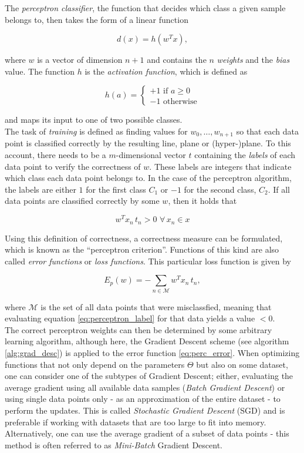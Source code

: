 The \textit{perceptron classifier}, the function that decides which class a given sample belongs to, then takes the form of a linear function

\[ d(x) = h(w^{T}x), \label{eq:perc_class} \]

\noindent where $w$ is a vector of dimension $n+1$ and contains the $n$ \textit{weights} and the \textit{bias} value. The function $h$ is the \textit{activation function}, which is defined as 

\[ h(a) =  \begin{cases}
		+1 \text{ if } a \geq 0 \\
	   	 -1 \text{ otherwise}
	    \end{cases}\]

\noindent and maps its input to one of two possible classes.\\

\noindent The task of \textit{training} is defined as finding values for $w_0, \dots, w_{n+1}$ so that each data point is classified correctly by the resulting line, plane or (hyper-)plane. To this account, there needs to be a $m$-dimensional vector $t$ containing the \textit{labels} of each data point to verify the correctness of $w$. These labels are integers that indicate which class each data point belongs to. In the case of the perceptron algorithm, the labels are either $1$ for the first class $C_1$ or $-1$ for the second class, $C_2$. If all data points are classified correctly by some $w$, then it holds that

\[ w^T x_n \, t_n > 0 \,\,\forall\, x_n \in x \label{eq:perceptron_label} \]

\noindent Using this definition of correctness, a correctness measure can be formulated, which is known as the ``perceptron criterion''. Functions of this kind are also called \textit{error functions} or \textit{loss functions}. This particular loss function is given by

\[ E_p(w) = - \sum \limits_{n \in \mathcal{M}} w^T x_n\, t_n, \label{eq:perc_error}\]

\noindent where $\mathcal{M}$ is the set of all data points that were misclassfied, meaning that evaluating equation \ref{eq:perceptron_label} for that data yields a value $< 0$. \cite[pp. 192--194]{bishop_pattern}\\

\noindent The correct perceptron weights can then be determined by some arbitrary learning algorithm, although here, the Gradient Descent scheme (see algorithm \ref{alg:grad_desc}) is applied to the error function \ref{eq:perc_error}. When optimizing functions that not only depend on the parameters $\Theta$ but also on some dataset, one can consider one of the subtypes of Gradient Descent; either, evaluating the average gradient using all available data samples (\textit{Batch Gradient Descent}) or using single data points only - as an approximation of the entire dataset - to perform the updates. This is called \textit{Stochastic Gradient Descent} (SGD) and is preferable if working with datasets that are too large to fit into memory. Alternatively, one can use the average gradient of a subset of data points - this method is often referred to as \textit{Mini-Batch} Gradient Descent.

